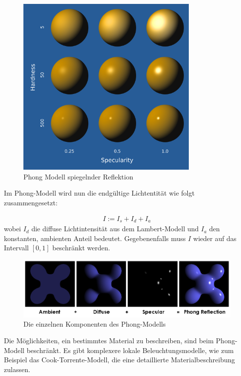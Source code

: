 \begin{figure}[H]
    \centering
    \includegraphics[width=0.8\textwidth]{images/phong.png}
    \caption{Phong Modell spiegelnder Reflektion}
    \label{fig:reflection-phong-specular-model}
\end{figure}

Im Phong-Modell wird nun die endgültige Lichtentität wie folgt zusammengesetzt:

\begin{align}
I := I_s + I_d + I_a
\end{align}
wobei $I_d$ die diffuse Lichtintensität aus dem Lambert-Modell und $I_a$ den konstanten, ambienten Anteil bedeutet.
Gegebenenfalls muss $I$ wieder auf das Intervall $[0,1]$ beschränkt werden.

\begin{figure}[H]
    \centering
    \includegraphics[width=1.0\textwidth]{images/Phong_Components.png}
    \caption{Die einzelnen Komponenten des Phong-Modells}
    \label{fig:phong-components}\end{figure}

Die Möglichkeiten, ein bestimmtes Material zu beschreiben, sind  beim Phong-Modell beschränkt. 
Es gibt komplexere lokale Beleuchtungsmodelle, wie zum Beispiel das Cook-Torrente-Modell, die eine detaillierte Materialbeschreibung zulassen.




